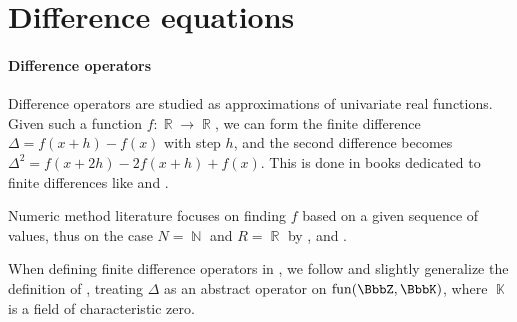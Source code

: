 \section{Difference equations}\label{sec:difference_equations}

\paragraph{Difference operators}

\begin{remark}\label{rem:finite_difference_literature}
  Difference operators are studied as approximations of univariate real functions. Given such a function \( f: \BbbR \to \BbbR \), we can form the finite difference \( \Delta = f(x + h) - f(x) \) with step \( h \), and the second difference becomes \( \Delta^2 = f(x + 2h) - 2f(x + h) + f(x) \). This is done in books dedicated to finite differences like  and .

  Numeric method literature focuses on finding \( f \) based on a given sequence of values, thus on the case \( N = \BbbN \) and \( R = \BbbR \) by ,  and .

  When defining finite difference operators in , we follow and slightly generalize the definition of , treating \( \Delta \) as an abstract operator on \( \fun(\BbbZ, \BbbK) \), where \( \BbbK \) is a field of characteristic zero.
\end{remark}


